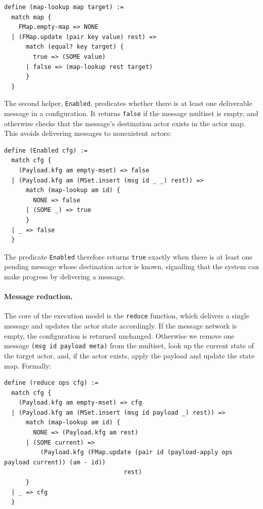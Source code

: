\begin{lstlisting}[language=Athena,style=athena]
define (map-lookup map target) :=
  match map {
    FMap.empty-map => NONE
  | (FMap.update (pair key value) rest) =>
      match (equal? key target) {
        true => (SOME value)
      | false => (map-lookup rest target)
      }
  }
\end{lstlisting}

The second helper, \lstinline{Enabled}, predicates whether there is at least one deliverable message in a configuration.  It returns \lstinline{false} if the message multiset is empty, and otherwise checks that the message’s destination actor exists in the actor map.  This avoids delivering messages to nonexistent actors:

\begin{lstlisting}[language=Athena,style=athena]
define (Enabled cfg) :=
  match cfg {
    (Payload.kfg am empty-mset) => false
  | (Payload.kfg am (MSet.insert (msg id _ _) rest)) =>
      match (map-lookup am id) {
        NONE => false
      | (SOME _) => true
      }
  | _ => false
  }
\end{lstlisting}

The predicate \lstinline{Enabled} therefore returns \lstinline{true} exactly when there is at least one pending message whose destination actor is known, signalling that the system can make progress by delivering a message.

\paragraph{Message reduction.}  The core of the execution model is the \lstinline{reduce} function, which delivers a single message and updates the actor state accordingly.  If the message network is empty, the configuration is returned unchanged.  Otherwise we remove one message \lstinline{(msg id payload meta)} from the multiset, look up the current state of the target actor, and, if the actor exists, apply the payload and update the state map. Formally:

\begin{lstlisting}[language=Athena,style=athena]
define (reduce ops cfg) :=
  match cfg {
    (Payload.kfg am empty-mset) => cfg
  | (Payload.kfg am (MSet.insert (msg id payload _) rest)) =>
      match (map-lookup am id) {
        NONE => (Payload.kfg am rest)
      | (SOME current) =>
          (Payload.kfg (FMap.update (pair id (payload-apply ops payload current)) (am - id))
                                 rest)
      }
  | _ => cfg
  }
\end{lstlisting}

